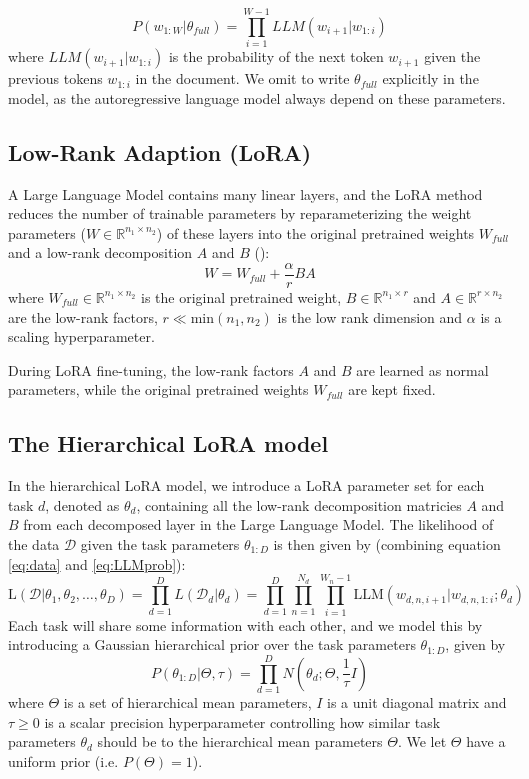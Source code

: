 \documentclass{article}
\newcommand{\R}{\mathbb{R}}
\begin{document}
\begin{equation} \label{eq:LLMprob}
P(w_{1:W} | \theta_{full}) = \prod_{i=1}^{W-1} LLM(w_{i+1} | w_{1:i})
\end{equation}
%
where $LLM(w_{i+1} | w_{1:i})$ is the probability of the next token $w_{i+1}$ given the previous tokens $w_{1:i}$ in the document.
We omit to write $\theta_{full}$ explicitly in the model, as the autoregressive language model always depend on these parameters.

\subsection{Low-Rank Adaption (LoRA)}
A Large Language Model contains many linear layers, and the LoRA method reduces the number of trainable parameters by reparameterizing the weight parameters ($W \in \R^{n_1 \times n_2}$) of these layers into the original pretrained weights $W_{full}$ and a low-rank decomposition $A$ and $B$ (\cite{hayou_lora_2024}):
\begin{equation} \label{eq:LoRA}
    W = W_{full} + \frac{\alpha}{r} BA 
\end{equation}
%
where $W_{full} \in \R^{n_1 \times n_2}$ is the original pretrained weight, $B \in \R^{n_1 \times r}$ and $A \in \R^{r \times n_2}$ are the low-rank factors, $r \ll \text{min}(n_1, n_2)$ is the low rank dimension and $\alpha$ is a scaling hyperparameter.

During LoRA fine-tuning, the low-rank factors $A$ and $B$ are learned as normal parameters, while the original pretrained weights $W_{full}$ are kept fixed.

\subsection{The Hierarchical LoRA model}
In the hierarchical LoRA model, we introduce a LoRA parameter set for each task $d$, denoted as $\theta_d$, containing all the low-rank decomposition matricies $A$ and $B$ from each decomposed layer in the Large Language Model. The likelihood of the data $\mathcal{D}$ given the task parameters $\theta_{1:D}$ is then given by (combining equation \ref{eq:data} and \ref{eq:LLMprob}):
\begin{equation} \label{eq:lik}
    \text{L}(\mathcal{D} | \theta_1, \theta_2, \ldots, \theta_D) = \prod_{d=1}^D L(\mathcal{D}_d | \theta_d) = \prod_{d=1}^D \prod_{n=1}^{N_d} \prod_{i=1}^{W_n-1} \text{LLM}(w_{d,n,i+1} | w_{d,n,1:i}; \theta_d)
\end{equation}
%
%
Each task will share some information with each other, and we model this by introducing a Gaussian hierarchical prior over the task parameters $\theta_{1:D}$, given by
\begin{equation} \label{eq:prior}
    P(\theta_{1:D} | \Theta, \tau ) = \prod_{d=1}^D N(\theta_d ; \Theta, \frac{1}{\tau} I)
\end{equation}
%
where $\Theta$ is a set of hierarchical mean parameters, $I$ is a unit diagonal matrix and $\tau \geq 0$ is a scalar precision hyperparameter controlling how similar task parameters $\theta_d$ should be to the hierarchical mean parameters $\Theta$.
We let $\Theta$ have a uniform prior (i.e. $P(\Theta) = 1$).
\end{document}
